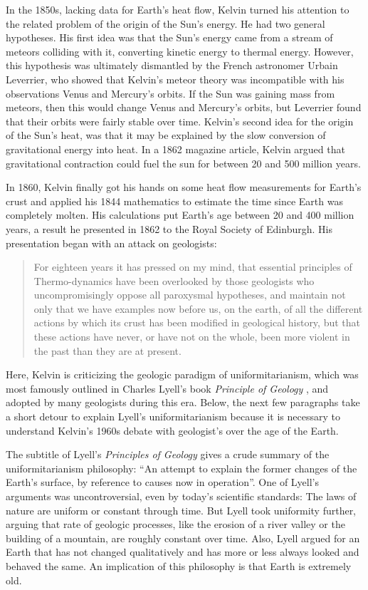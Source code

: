 \documentclass[12pt]{article}
\begin{document}
In the 1850s, lacking data for Earth's heat flow, Kelvin turned his attention to the related problem of the origin of the Sun's energy. He had two general hypotheses. His first idea was that the Sun's energy came from a stream of meteors colliding with it, converting kinetic energy to thermal energy. However, this hypothesis was ultimately dismantled by the French astronomer Urbain Leverrier, who showed that Kelvin's meteor theory was incompatible with his observations Venus and Mercury's orbits. If the Sun was gaining mass from meteors, then this would change Venus and Mercury's orbits, but Leverrier found that their orbits were fairly stable over time. Kelvin's second idea for the origin of the Sun's heat, was that it may be explained by the slow conversion of gravitational energy into heat. In a 1862 magazine article, Kelvin argued that gravitational contraction could fuel the sun for between 20 and 500 million years.

In 1860, Kelvin finally got his hands on some heat flow measurements for Earth's crust and applied his 1844 mathematics to estimate the time since Earth was completely molten. His calculations put Earth's age between 20 and 400 million years, a result he presented in 1862 to the Royal Society of Edinburgh. His presentation began with an attack on geologists: 

\begin{quote}
  For eighteen years it has pressed on my mind, that essential principles of Thermo-dynamics have been overlooked by those geologists who uncompromisingly oppose all paroxysmal hypotheses, and maintain not only that we have examples now before us, on the earth, of all the different actions by which its crust has been modified in geological history, but that these actions have never, or have not on the whole, been more violent in the past than they are at present.
\end{quote}
Here, Kelvin is criticizing the geologic paradigm of uniformitarianism, which was most famously outlined in Charles Lyell's book \emph{Principle of Geology} \citep{Lyell_1833}, and adopted by many geologists during this era. Below, the next few paragraphs take a short detour to explain Lyell's uniformitarianism because it is necessary to understand Kelvin's 1960s debate with geologist's over the age of the Earth.

The subtitle of Lyell's \emph{Principles of Geology} gives a crude summary of the uniformitarianism philosophy: ``An attempt to explain the former changes of the Earth's surface, by reference to causes now in operation''. One of Lyell's arguments was uncontroversial, even by today's scientific standards: The laws of nature are uniform or constant through time. But Lyell took uniformity further, arguing that rate of geologic processes, like the erosion of a river valley or the building of a mountain, are roughly constant over time. Also, Lyell argued for an Earth that has not changed qualitatively and has more or less always looked and behaved the same. An implication of this philosophy is that Earth is extremely old.
\end{document}
